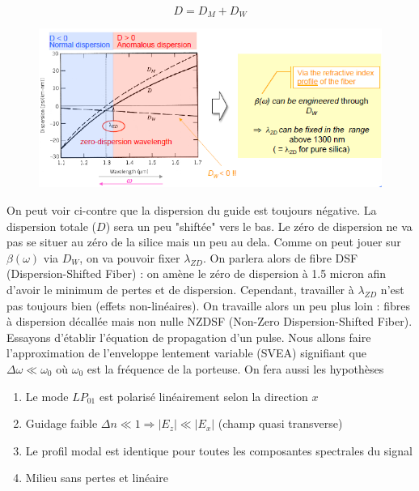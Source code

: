 	\begin{equation}
	D = D_M + D_W
	\end{equation}
		\begin{figure}
	\includegraphics[scale=0.6]{ch1/image33}
	\end{figure}	
	On peut voir ci-contre que la dispersion du guide est toujours négative. La dispersion totale 
	($D$) sera un peu "shiftée" vers le bas. Le zéro de dispersion ne va pas se situer au zéro de
	la silice mais un peu au dela. Comme on peut jouer sur $\beta(\omega)$ via $D_W$, on va pouvoir
	fixer $\lambda_{ZD}$.  On parlera alors de fibre DSF (Dispersion-Shifted Fiber) : on amène le
	zéro de dispersion à 1.5 micron afin d'avoir le minimum de pertes et de dispersion. Cependant,
	travailler à $\lambda_{ZD}$ n'est pas toujours bien (effets non-linéaires). On travaille alors
	un peu plus loin : fibres à dispersion décallée mais non nulle NZDSF (Non-Zero Dispersion-Shifted
	Fiber).\\
	
	Essayons d'établir l'équation de propagation d'un pulse. Nous allons faire l'approximation de
	l'enveloppe lentement variable (SVEA) signifiant que $\Delta \omega\ll \omega_0$ où 
	$\omega_0$ est la fréquence de la porteuse. On fera aussi les hypothèses
	\begin{enumerate}
	\item Le mode $LP_{01}$ est polarisé linéairement selon la direction $x$
	\item Guidage faible $\Delta n \ll 1 \Rightarrow |E_z|\ll |E_x|$ (champ quasi transverse)
	\item Le profil modal est identique pour toutes les composantes spectrales du signal
	\item Milieu sans pertes et linéaire
	\end{enumerate}

